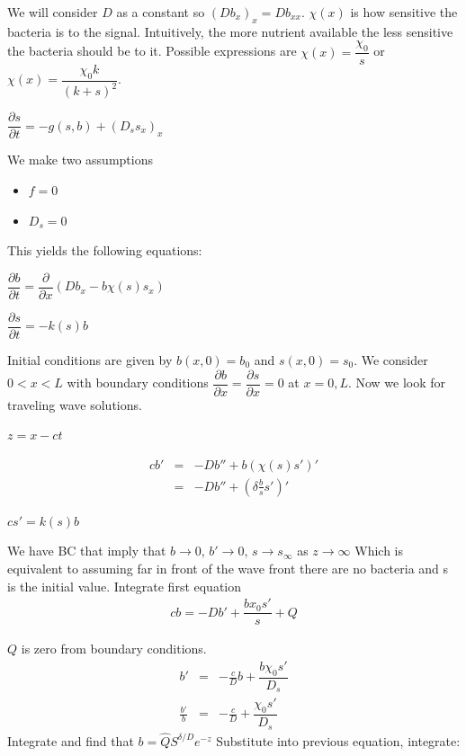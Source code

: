 \documentclass[]{article}
\numberwithin{equation}{section}		%
\def\bea{\begin{eqnarray}}
\def\ena{\end{eqnarray}}
\begin{document}
We will consider $D$ as a constant so $(Db_{x})_{x}=Db_{xx}$. $\chi(x)$ is how sensitive the bacteria is to the signal. Intuitively, the more nutrient available the less sensitive the bacteria should be to it. Possible expressions are $\chi(x) = \dfrac{\chi_{0}}{s}$ or $\chi(x)=\dfrac{\chi_{0}k}{(k+s)^{2}}$.

\begin{center}
$\dfrac{\partial s}{\partial t}=-g(s,b) + (D_{s}s_{x})_{x}$
\end{center}

We make two assumptions
\begin{itemize}
\item $f=0$
\item $D_{s}=0$
\end{itemize}

This yields the following equations:

\begin{center}
$\dfrac{\partial b}{\partial t}=\dfrac{\partial}{\partial x}(Db_{x}-b\chi(s)s_{x})$
\end{center}

\begin{center}
$\dfrac{\partial s}{\partial t}=-k(s)b$
\end{center}

\noindent Initial conditions are given by $b(x,0)=b_{0}$ and $s(x,0) = s_{0}$. We consider  $0<x<L$ with boundary conditions $\dfrac{\partial b}{\partial x} = \dfrac{\partial s}{\partial x} = 0$ at $x=0,L$. Now we look for traveling wave solutions. 

\begin{center}
$z=x-ct$
\end{center}

\bea
cb'&=&-Db''+b(\chi(s)s')'\nonumber \\
&=&-Db''+(\delta \frac{b}{s} s')' \nonumber
\ena
\begin{center}
$cs'=k(s)b$
\end{center}
We have BC that imply that $b\rightarrow 0$, $b'\rightarrow 0$, $s\rightarrow s_{\infty}$ as $z\rightarrow\infty$
Which is equivalent to assuming far in front of the wave front there are no bacteria and s is the initial value.
 Integrate first equation
\bea
cb=-Db'+\dfrac{bx_{0}s'}{s}+Q 
\ena

$Q$ is zero from boundary conditions.
\bea
b'&=&-\frac{c}{D}b+\dfrac{b\chi_{0}s'}{D_{s}} \nonumber \\
\frac{b'}{b} &=&-\frac{c}{D}+\dfrac{\chi_{0}s'}{D_{s}} \nonumber
\ena
Integrate and find that $b=\hat Q S^{\delta/D}e^{-z}$
Substitute into previous equation, integrate:
\end{document}
